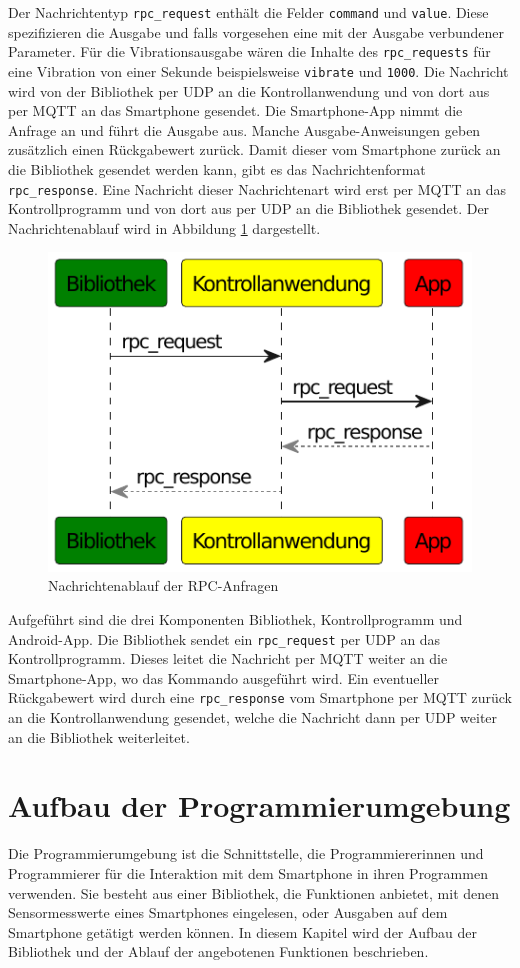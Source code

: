 \documentclass[11pt,a4paper]{report}
\begin{document}
Der Nachrichtentyp \texttt{rpc\_request} enthält die Felder \texttt{command} und \texttt{value}.
Diese spezifizieren die Ausgabe und falls vorgesehen eine mit der Ausgabe verbundener Parameter.
Für die Vibrationsausgabe wären die Inhalte des \texttt{rpc\_requests} für eine Vibration von einer Sekunde beispielsweise \texttt{vibrate} und \texttt{1000}.
Die Nachricht wird von der Bibliothek per UDP an die Kontrollanwendung und von dort aus per MQTT an das Smartphone gesendet.
Die Smartphone-App nimmt die Anfrage an und führt die Ausgabe aus.
Manche Ausgabe-Anweisungen geben zusätzlich einen Rückgabewert zurück.
Damit dieser vom Smartphone zurück an die Bibliothek gesendet werden kann, gibt es das Nachrichtenformat \texttt{rpc\_response}.
Eine Nachricht dieser Nachrichtenart wird erst per MQTT an das Kontrollprogramm und von dort aus per UDP an die Bibliothek gesendet.
Der Nachrichtenablauf wird in Abbildung \ref{fig:message_flow_rpc} dargestellt.
\begin{figure}[htbp]
\centering
\includegraphics[width=.5\textwidth]{images/message_flow_rpc.pdf}
\caption{Nachrichtenablauf der RPC-Anfragen}
\label{fig:message_flow_rpc}
\end{figure}
Aufgeführt sind die drei Komponenten Bibliothek, Kontrollprogramm und Android-App.
Die Bibliothek sendet ein \texttt{rpc\_request} per UDP an das Kontrollprogramm.
Dieses leitet die Nachricht per MQTT weiter an die Smartphone-App, wo das Kommando ausgeführt wird.
Ein eventueller Rückgabewert wird durch eine \texttt{rpc\_response} vom Smartphone per MQTT zurück an die Kontrollanwendung gesendet, welche die Nachricht dann per UDP weiter an die Bibliothek weiterleitet.

\chapter{Aufbau der Programmierumgebung}\label{chap:libs}
Die Programmierumgebung ist die Schnittstelle, die Programmiererinnen und Programmierer für die Interaktion mit dem Smartphone in ihren Programmen verwenden.
Sie besteht aus einer Bibliothek, die Funktionen anbietet, mit denen Sensormesswerte eines Smartphones eingelesen, oder Ausgaben auf dem Smartphone getätigt werden können.
In diesem Kapitel wird der Aufbau der Bibliothek und der Ablauf der angebotenen Funktionen beschrieben. 
\end{document}
